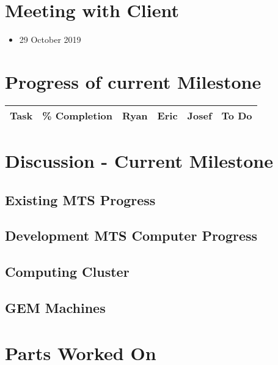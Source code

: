 \documentclass[12pt]{article}
\begin{document}
\section{Meeting with Client}

\begin{itemize}
\item[] 29 October 2019
\end{itemize}

\section{Progress of current Milestone}

  \begin{center}
  \begin{tabular}{|c|c|c|c|c|c|}
    \hline
    Task & \% Completion & Ryan & Eric & Josef & To Do \\
    \hline

    \hline   
  \end{tabular}
\end{center}

\section{Discussion - Current Milestone}

\subsection{Existing MTS Progress}


\subsection{Development MTS Computer Progress}



\subsection{Computing Cluster}



\subsection{GEM Machines}


\section{Parts Worked On}
\end{document}
